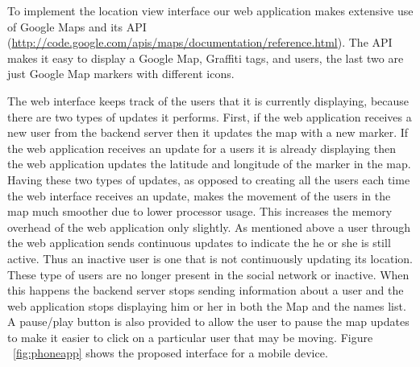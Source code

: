 \documentclass[11pt]{article}
\begin{document}
To implement the location view interface our web
application makes extensive use of Google Maps and its API
(\url{http://code.google.com/apis/maps/documentation/reference.html}).
The API makes it easy to display a Google Map, Graffiti tags, and users,
the last two are just Google Map markers with different icons.

The web interface keeps track of the users that it is currently
displaying, because there are two types of updates it performs. First,
if the web application receives a new user from the  backend server
then it updates the map with a new marker. If the web application receives an update for
a users it is already displaying then the web application updates the
latitude and longitude of the marker in the map. Having these two types
of updates, as opposed to creating all the users each time the web interface receives
an update, makes the movement of the users in the map much smoother due
to lower processor usage. This increases the memory overhead of the web
application only slightly. As mentioned above a user through the web
application sends continuous updates to indicate the he or she is still
active. Thus an inactive user is one that is not continuously updating
its location. These type of users are no longer present in the social
network or inactive. When this happens the backend server stops sending
information about a user and the web application stops displaying him
or her in both the Map and the names list. A pause/play button is also
provided to allow the user to pause the map updates to make it easier to
click on a particular user that may be moving. Figure ~\ref{fig:phoneapp}
shows the proposed interface for a mobile device.
\end{document}
